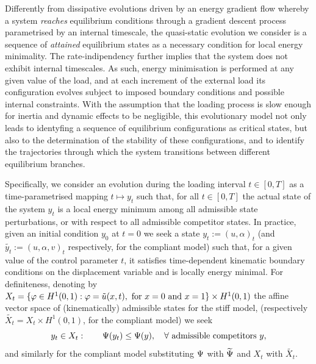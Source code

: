 Differently from dissipative evolutions driven by an energy gradient flow whereby a system \emph{reaches} equilibrium conditions through a gradient descent process parametrised by an internal timescale, the quasi-static evolution we consider is a sequence of \emph{attained} equilibrium states as a necessary condition for local energy minimality. 
The rate-indipendency further implies that the system does not exhibit internal timescales.
As such, energy minimisation is performed at any given value of the load, and at each increment of the external load its configuration evolves subject to imposed boundary conditions and possible internal constraints.
With the assumption that the loading process is slow enough for inertia and dynamic effects to be negligible, this evolutionary model not only leads to identyfing a sequence of equilibrium configurations as critical states, but also to the determination of the stability of these configurations, and to identify the trajectories through which the system transitions between different equilibrium branches.
% 

Specifically, we consider an evolution during the loading interval $t\in [0, T]$ as a time-parametrised mapping $t\mapsto y_t$  such that, for all $t\in [0, T]$ the actual state of the system $y_t$ is a local energy minimum among all admissible state perturbations, or with respect to all admissible competitor states. %
In practice, given an initial condition $y_0$ at $t=0$ we seek a state $y_t:=(u, \alpha)_t$ (and $\widetilde{y_t}:=(u, \alpha, v)_t$ respectively, for the compliant model) such that, for a given value of the control parameter $t$, it satisfies time-dependent kinematic boundary conditions on the displacement variable and is locally energy minimal. 
For definiteness, denoting by $X_t = \{\varphi\in H^1(0, 1):\varphi=\tilde u(x, t),\text{ for } x=0\text{ and } x=1\}\times H^1(0,1)$ the affine vector space of (kinematically) admissible states for the stiff model, (respectively $\widetilde{X_t} = X_t\times H^1(0, 1)$, for the compliant model) 
we seek 
\begin{equation}
    \label{eq:variational_global_ineq}
    y_t\in X_t: \qquad \Psi(y_t) \leq \Psi(y),\quad \forall \text{ admissible competitors } y,
\end{equation}
and similarly for the compliant model substituting $\Psi$ with $\widetilde\Psi$ and $X_t$ with $\widetilde{X_t}$.
